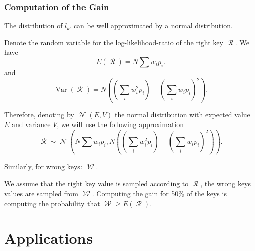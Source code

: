 \documentclass[11pt]{beamer}
\DeclareMathOperator{\R}{\mathcal{R}}
\DeclareMathOperator{\W}{\mathcal{W}}
\DeclareMathOperator{\Var}{Var}
\DeclareMathOperator{\N}{\mathcal{N}}
\begin{document}
\begin{frame}
\frametitle{Computation of the Gain}

The distribution of $l_{k'}$ can be well approximated by a normal distribution. 

Denote the random variable for the log-likelihood-ratio of the right key $\R$. We have
\[ E(\R)=N \sum w_ip_i  .\]
and
\[ \Var(\R)=N\left( \left(\sum_i w_i^2 p_i \right) -\left(\sum_i w_i p_i \right)^2 \right).\]

\framebreak

Therefore, denoting by $\N\left(E,V\right)$ the normal distribution with expected value $E$ and variance $V$, we will use the following approximation
\[ \R \sim \N\left(N \sum w_ip_i, N\left( \left(\sum_i w_i^2 p_i \right) -\left(\sum_i w_i p_i \right)^2 \right)\right).\]

Similarly, for wrong keys: $\W$.

\framebreak

We assume that the right key value is sampled according to ${\R}$, the wrong keys values are sampled from ${\W}$. Computing the gain for 50\% of the keys is computing the probability that $\W \ge E(\R)$.

\begin{center}
\newcommand{\normdist}[5]{\draw[#3] plot[id=#4,samples=100,domain=#5] function {  1/sqrt(2*pi*#2) * exp(- ((x-#1)**2 / (2*#2)) ) };}
\end{center}

\end{frame}

\section{Applications}
\end{document}
